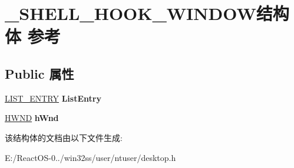 \hypertarget{struct___s_h_e_l_l___h_o_o_k___w_i_n_d_o_w}{}\section{\+\_\+\+S\+H\+E\+L\+L\+\_\+\+H\+O\+O\+K\+\_\+\+W\+I\+N\+D\+O\+W结构体 参考}
\label{struct___s_h_e_l_l___h_o_o_k___w_i_n_d_o_w}
\subsection*{Public 属性}
\begin{DoxyCompactItemize}
\item 
\mbox{\label{struct___s_h_e_l_l___h_o_o_k___w_i_n_d_o_w_aae7ce09f40eeb16fea00469e4a16d94e}} 
\hyperlink{struct___l_i_s_t___e_n_t_r_y}{L\+I\+S\+T\+\_\+\+E\+N\+T\+RY} {\bfseries List\+Entry}
\item 
\mbox{\label{struct___s_h_e_l_l___h_o_o_k___w_i_n_d_o_w_ada5ff4d34d3eb7d7fb1f8a1e7e8e1171}} 
\hyperlink{interfacevoid}{H\+W\+ND} {\bfseries h\+Wnd}
\end{DoxyCompactItemize}


该结构体的文档由以下文件生成\+:\begin{DoxyCompactItemize}
\item 
E\+:/\+React\+O\+S-\/0../win32ss/user/ntuser/desktop.\+h\end{DoxyCompactItemize}
